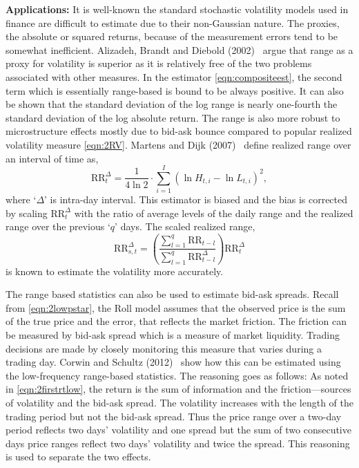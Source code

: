 \noindent\textbf{Applications:} It is well-known the standard stochastic volatility models used in finance are difficult to estimate due to their non-Gaussian nature. The proxies, the absolute or squared returns, because of the measurement errors tend to be somewhat inefficient. Alizadeh, Brandt and Diebold (2002)~\cite{diebold} argue that range as a proxy for volatility is superior as it is relatively free of the two problems associated with other measures. In the estimator \eqref{eqn:compositeest}, the second term which is essentially range-based is bound to be always positive. It can also be shown that the standard deviation of the log range is nearly one-fourth the standard deviation of the log absolute return. The range is also more robust to microstructure effects mostly due to bid-ask bounce compared to popular realized volatility measure \eqref{eqn:2RV}. Martens and Dijk (2007)~\cite{dijk} define realized range over an interval of time as,
	\begin{equation} \label{eqn:rrtdelta}
	\text{RR}_t^\Delta= \dfrac{1}{4\ln 2} \cdot \sum_{i=1}^I (\ln H_{t,i} - \ln L_{t,i})^2,
	\end{equation}
where `$\Delta$' is intra-day interval. This estimator is biased and the bias is corrected by scaling $\text{RR}_t^\Delta$ with the ratio of average levels of the daily range and the realized range over the previous `$q$' days. The scaled realized range,
	\begin{equation} \label{eqn:rrstdelta}
	\text{RR}_{s,t}^\Delta= \left( \dfrac{\sum_{l=1}^q \text{RR}_{t-l}}{\sum_{l=1}^q \text{RR}_{t-l}^\Delta}  \right) \text{RR}_t^\Delta
	\end{equation}
is known to estimate the volatility more accurately. 


The range based statistics can also be used to estimate bid-ask spreads. Recall from \eqref{eqn:2lowpstar}, the Roll model assumes that the observed price is the sum of the true price and the error, that reflects the market friction. The friction can be measured by bid-ask spread which is a measure of market liquidity. Trading decisions are made by closely monitoring this measure that varies during a trading day. Corwin and Schultz (2012)~\cite{schultz12} show how this can be estimated using the low-frequency range-based statistics. The reasoning goes as follows: As noted in \eqref{eqn:2firstrtlow}, the return is the sum of information and the friction---sources of volatility and the bid-ask spread. The volatility increases with the length of the trading period but not the bid-ask spread. Thus the price range over a two-day period reflects two days' volatility and one spread but the sum of two consecutive days price ranges reflect two days' volatility and twice the spread. This reasoning is used to separate the two effects.


